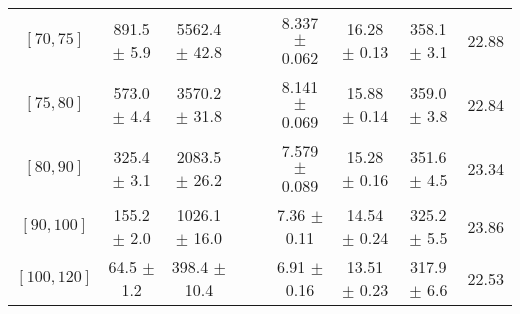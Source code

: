 \begin{tabular}{c||c|c|c|c|c|c|c||c}
$[70, 75]$ & 891.5 $\pm$ 5.9 & 5562.4 $\pm$ 42.8 &  &  & 8.337 $\pm$ 0.062 & 16.28 $\pm$ 0.13 & 358.1 $\pm$ 3.1 & 22.88\\
$[75, 80]$ & 573.0 $\pm$ 4.4 & 3570.2 $\pm$ 31.8 &  &  & 8.141 $\pm$ 0.069 & 15.88 $\pm$ 0.14 & 359.0 $\pm$ 3.8 & 22.84\\
$[80, 90]$ & 325.4 $\pm$ 3.1 & 2083.5 $\pm$ 26.2 &  &  & 7.579 $\pm$ 0.089 & 15.28 $\pm$ 0.16 & 351.6 $\pm$ 4.5 & 23.34\\
$[90, 100]$ & 155.2 $\pm$ 2.0 & 1026.1 $\pm$ 16.0 &  &  & 7.36 $\pm$ 0.11 & 14.54 $\pm$ 0.24 & 325.2 $\pm$ 5.5 & 23.86\\
$[100, 120]$ & 64.5 $\pm$ 1.2 & 398.4 $\pm$ 10.4 &  &  & 6.91 $\pm$ 0.16 & 13.51 $\pm$ 0.23 & 317.9 $\pm$ 6.6 & 22.53\\
\end{tabular}
